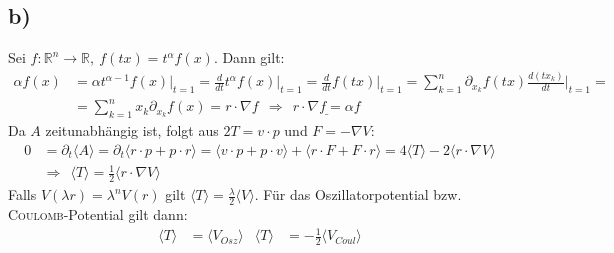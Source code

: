 \documentclass[a4paper,12pt]{article}
\newcommand{\bra}{}
\begin{document}
\subsection*{b)}
Sei $f:\mathbb{R}^n\rightarrow\mathbb{R},\ f(tx)=t^\alpha f(x)$. Dann gilt:
\begin{align*}
\alpha f(x)&=\alpha t^{\alpha -1}f(x)\bigg\vert_{t=1}=\frac{d}{dt}t^\alpha f(x)\bigg\vert_{t=1}=\frac{d}{dt}f(tx)\bigg\vert_{t=1}=\sum_{k=1}^n\partial_{x_k}f(tx)\frac{d(tx_k)}{dt}\bigg\vert_{t=1}= \\
&=\sum_{k=1}^nx_k\partial_{x_k}f(x)=r\cdot\nabla f\ \ \Rightarrow\ \ \underline{ r\cdot \nabla f=\alpha f}
\end{align*}
Da $A$ zeitunabhängig ist, folgt aus $2T=v\cdot p$ und $F=-\nabla V$:
\begin{align*}
0&=\partial_t\bra\langle {A}\rangle=\partial_t\bra\langle {r\cdot p+p\cdot r}\rangle=\bra\langle {v\cdot p+p\cdot v}\rangle+\bra\langle {r\cdot F+F\cdot r}\rangle=4\bra\langle {T}\rangle-2\bra\langle {r\cdot\nabla V}\rangle\\
&\Rightarrow\ \ \bra\langle {T}\rangle=\frac{1}{2}\bra\langle {r\cdot\nabla V}\rangle
\end{align*}
Falls $V(\lambda r)=\lambda^nV(r)$ gilt $\bra\langle {T}\rangle=\frac{\lambda}{2}\bra\langle {V}\rangle$. Für das Oszillatorpotential bzw. \textsc{Coulomb}-Potential gilt dann:
\begin{align*}
\bra\langle {T}\rangle&=\bra\langle {V_{Osz}}\rangle &\bra\langle {T}\rangle&=-\frac{1}{2}\bra\langle {V_{Coul}}\rangle
\end{align*}
\end{document}
